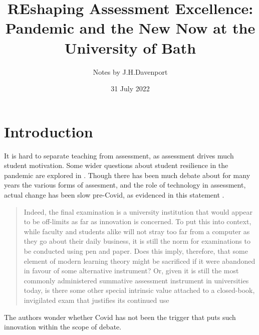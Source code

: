 \documentclass{article}
\begin{document}
\author{Notes by J.H.Davenport}
\title{REshaping Assessment Excellence: Pandemic and the New Now at the University of Bath}
\date{31 July 2022}
\maketitle
\section{Introduction}
It is hard to separate teaching from assessment, as assessment drives much student motivation. Some wider questions about student resilience in the pandemic are explored in \citet{Cricketal2022e}. Though there has been much debate about for many years the various forms of assesment, and the role of technology in assessment, actual change has been slow pre-Covid, as evidenced in this statement \citep{WilliamsWong2009a}.
\begin{quote}
Indeed, the final examination is a university institution that would appear to be off-limits as far as innovation is concerned. To put this into context, while faculty and students alike will not stray too far from a computer as they go about their daily business, it is still the norm for examinations to be conducted using pen and paper. Does this imply, therefore, that some element of modern learning theory might be sacrificed if it were abandoned in favour of some alternative instrument? Or, given it is still the most commonly administered summative assessment instrument in universities today, is there some other special intrinsic value attached to a closed-book, invigilated exam that justifies its continued use
\end{quote}
The authors wonder whether Covid has not been the trigger that puts such innovation within the scope of debate.
\def\r{$\rightarrow$}
\end{document}
